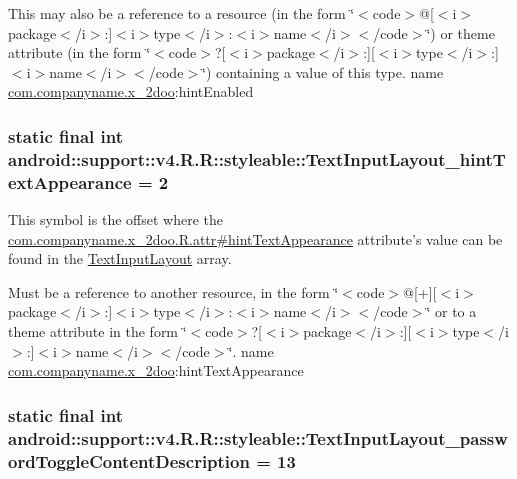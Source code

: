 This may also be a reference to a resource (in the form \char`\"{}$<$code$>$@\mbox{[}$<$i$>$package$<$/i$>$:\mbox{]}$<$i$>$type$<$/i$>$:$<$i$>$name$<$/i$>$$<$/code$>$\char`\"{}) or theme attribute (in the form \char`\"{}$<$code$>$?\mbox{[}$<$i$>$package$<$/i$>$:\mbox{]}\mbox{[}$<$i$>$type$<$/i$>$:\mbox{]}$<$i$>$name$<$/i$>$$<$/code$>$\char`\"{}) containing a value of this type.  name \hyperlink{namespacecom_1_1companyname_1_1x__2doo}{com.companyname.x\_\-2doo}:hintEnabled \hypertarget{classandroid_1_1support_1_1v4_1_1_r_1_1styleable_c535b56b26e64b26c7f84158fc06f41a}{
\subsubsection[{TextInputLayout\_\-hintTextAppearance}]{\setlength{\rightskip}{0pt plus 5cm}static final int android::support::v4.R.R::styleable::TextInputLayout\_\-hintTextAppearance = 2}}
\label{classandroid_1_1support_1_1v4_1_1_r_1_1styleable_c535b56b26e64b26c7f84158fc06f41a}


This symbol is the offset where the \hyperlink{classcom_1_1companyname_1_1x__2doo_1_1_r_1_1attr_c38cc4dc2f8439053a813eb5b6c09bed}{com.companyname.x\_\-2doo.R.attr\#hintTextAppearance} attribute's value can be found in the \hyperlink{classandroid_1_1support_1_1v4_1_1_r_1_1styleable_880beb171ce483ab1b63a82ef7f9d976}{TextInputLayout} array.

Must be a reference to another resource, in the form \char`\"{}$<$code$>$@\mbox{[}+\mbox{]}\mbox{[}$<$i$>$package$<$/i$>$:\mbox{]}$<$i$>$type$<$/i$>$:$<$i$>$name$<$/i$>$$<$/code$>$\char`\"{} or to a theme attribute in the form \char`\"{}$<$code$>$?\mbox{[}$<$i$>$package$<$/i$>$:\mbox{]}\mbox{[}$<$i$>$type$<$/i$>$:\mbox{]}$<$i$>$name$<$/i$>$$<$/code$>$\char`\"{}.  name \hyperlink{namespacecom_1_1companyname_1_1x__2doo}{com.companyname.x\_\-2doo}:hintTextAppearance \hypertarget{classandroid_1_1support_1_1v4_1_1_r_1_1styleable_bf936cf60adff593b4d8f71e2914568b}{
\subsubsection[{TextInputLayout\_\-passwordToggleContentDescription}]{\setlength{\rightskip}{0pt plus 5cm}static final int android::support::v4.R.R::styleable::TextInputLayout\_\-passwordToggleContentDescription = 13}}
\label{classandroid_1_1support_1_1v4_1_1_r_1_1styleable_bf936cf60adff593b4d8f71e2914568b}


